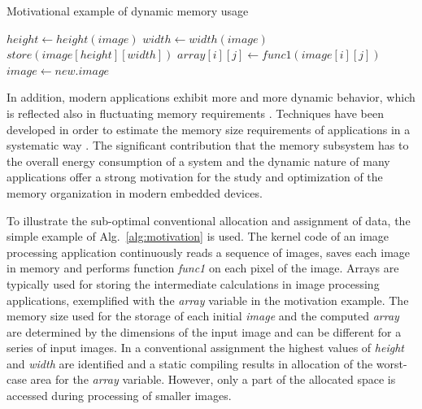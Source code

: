 \begin{algorithm}
\caption{Motivational example of dynamic memory usage}
 \label{alg:motivation}
 \begin{algorithmic}[1]
		\STATE $height \gets height(image)$
		\STATE $width \gets width(image)$
		\STATE $store(image[height][width])$
					\STATE $array[i][j] \gets func1(image[i][j])$
				\ENDFOR
			\ENDFOR
		\STATE $image \gets new.image$	
	\ENDWHILE
 \end{algorithmic}
\end{algorithm}

In addition, modern applications exhibit more and more dynamic behavior, which is reflected also in fluctuating memory requirements \cite{tcm}. 
Techniques have been developed in order to estimate the memory size requirements of applications in a systematic way \cite{Ang13}. 
The significant contribution that the memory subsystem has to the overall energy consumption of a system and the dynamic nature of many applications offer a strong motivation for the study and optimization of the memory organization in modern embedded devices.

To illustrate the sub-optimal conventional allocation and assignment of data, the simple example of Alg.~\ref{alg:motivation} is used. 
The kernel code of an image processing application continuously reads a sequence of images, saves each image in memory and performs function \textit{func1} on each pixel of the image. 
Arrays are typically used for storing the intermediate calculations in image processing applications, exemplified with the \textit{array} variable in the motivation example. 
The memory size used for the storage of each initial \textit{image} and the computed \textit{array} are determined by the dimensions of the input image and can be different for a series of input images. 
In a conventional assignment the highest values of \textit{height} and \textit{width} are identified and a static compiling results in allocation of the worst-case area for the \textit{array} variable. 
However, only a part of the allocated space is accessed during processing of smaller images. 

